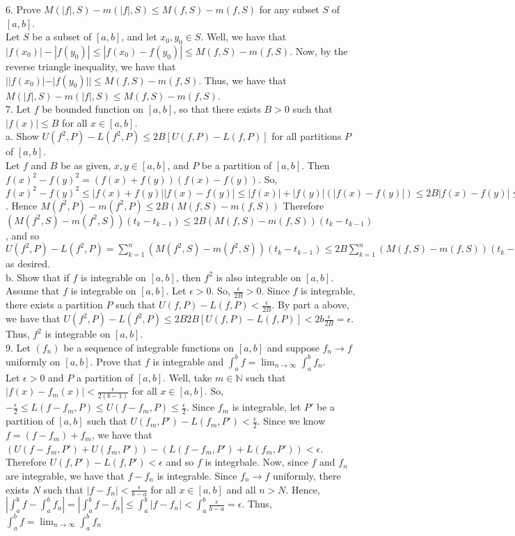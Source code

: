 \documentclass[12pt]{article}
\begin{document}
6. Prove $M(|f|,S)-m(|f|,S)\leq M(f,S)-m(f,S)$ for any subset $S$ of $[a,b]$.\\
Let $S$ be a subset of $[a,b]$, and let $x_0,y_0\in S$. Well, we have that $|f(x_0)|-|f(y_0)|\leq|f(x_0)-f(y_0)|\leq M(f,S)-m(f,S)$. Now, by the reverse triangle inequality, we have that $||f(x_0)|-|f(y_0)||\leq M(f,S)-m(f,S)$. Thus, we have that $M(|f|,S)-m(|f|,S)\leq M(f,S)-m(f,S)$.\\

7. Let $f$ be bounded function on $[a,b]$, so that there exists $B>0$ such that $|f(x)|\leq B$ for all $x\in[a,b]$.\\
a. Show $U(f^2,P)-L(f^2,P)\leq2B[U(f,P)-L(f,P)]$ for all partitions $P$ of $[a,b]$.\\
Let $f$ and $B$ be as given, $x,y\in[a,b]$, and $P$ be a partition of $[a,b]$. Then $f(x)^2-f(y)^2=(f(x)+f(y))(f(x)-f(y))$. So, $f(x)^2-f(y)^2\leq|f(x)+f(y)||f(x)-f(y)|\leq|f(x)|+|f(y)|(|f(x)-f(y)|)\leq2B|f(x)-f(y)|\leq2B(M(f,S)-m(f,S))$. Hence $M(f^2,P)-m(f^2,P)\leq 2B(M(f,S)-m(f,S))$ Therefore $(M(f^2,S)-m(f^2,S))(t_k-t_{k-1})\leq2B(M(f,S)-m(f,S))(t_k-t_{k-1})$, and so $U(f^2,P)-L(f^2,P)=\sum_{k=1}^n(M(f^2,S)-m(f^2,S))(t_k-t_{k-1})\leq2B\sum_{k=1}^n(M(f,S)-m(f,S))(t_k-t_{k-1})=2B[U(f,P)-L(f,P)]$ as desired.\\
b. Show that if $f$ is integrable on $[a,b]$, then $f^2$ is also integrable on $[a,b]$.\\
Assume that $f$ is integrable on $[a,b]$. Let $\epsilon>0$. So, $\frac{\epsilon}{2B}>0$. Since $f$ is integrable, there exists a partition $P$ such that $U(f,P)-L(f,P)<\frac{\epsilon}{2B}$. By part a above, we have that $U(f^2,P)-L(f^2,P)\leq2B2B[U(f,P)-L(f,P)]<2b\frac{\epsilon}{2B}=\epsilon$. Thus, $f^2$ is integrable on $[a,b]$.\\[20pt]

9. Let $(f_n)$ be a sequence of integrable functions on $[a,b]$ and suppose $f_n\rightarrow f$ uniformly on $[a,b]$. Prove that $f$ is integrable and $\int_a^bf=\lim_{n\rightarrow\infty}\int_a^bf_n$.\\
Let $\epsilon>0$ and $P$ a partition of $[a,b]$. Well, take $m\in\mathbb{N}$ such that $|f(x)-f_m(x)|<\frac{\epsilon}{2(b-1)}$ for all $x\in[a,b]$. So, $-\frac{\epsilon}{2}\leq L(f-f_m,P)\leq U(f-f_m,P)\leq\frac{\epsilon}{2}$. Since $f_m$ is integrable, let $P'$ be a partition of $[a,b]$ such that $U(f_m,P')-L(f_m,P')<\frac{\epsilon}{2}$. Since we know $f=(f-f_m)+f_m$, we have that $(U(f-f_m,P')+U(f_m,P'))-(L(f-f_m,P')+L(f_m,P'))<\epsilon$. Therefore $U(f,P')-L(f,P')<\epsilon$ and so $f$ is integrbale. Now, since $f$ and $f_n$ are integrable, we have that $f-f_n$ is integrable. Since $f_n\rightarrow f$ uniformly, there exists $N$ such that $|f-f_n|<\frac{\epsilon}{b-a}$ for all $x\in[a,b]$ and all $n>N$. Hence, $|\int_a^bf-\int_a^bf_n|=|\int_a^bf-f_n|\leq\int_a^b|f-f_n|<\int_a^b\frac{\epsilon}{b-a}=\epsilon$. Thus, $\int_a^bf=\lim_{n\rightarrow\infty}\int_a^bf_n$\\[20pt]
\end{document}

